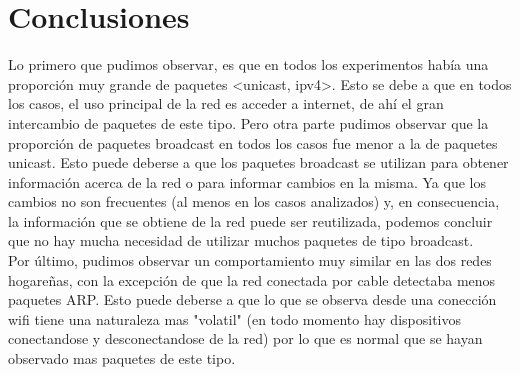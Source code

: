 \section{Conclusiones}
Lo primero que pudimos observar, es que en todos los experimentos había una proporción muy grande de paquetes <unicast, ipv4>. Esto se debe a que en todos los casos, el uso principal de la red es acceder a internet, de ahí el gran intercambio de paquetes de este tipo. Pero otra parte pudimos observar que la proporción de paquetes broadcast en todos los casos fue menor a la de paquetes unicast. Esto puede deberse a que los paquetes broadcast se utilizan para obtener información acerca de la red o para informar cambios en la misma. Ya que los cambios no son frecuentes (al menos en los casos analizados) y, en consecuencia, la información que se obtiene de la red puede ser reutilizada, podemos concluir que no hay mucha necesidad de utilizar muchos paquetes de tipo broadcast.\\
Por último, pudimos observar un comportamiento muy similar en las dos redes hogareñas, con la excepción de que la red conectada por cable detectaba menos paquetes ARP. Esto puede deberse a que lo que se observa desde una conección wifi tiene una naturaleza mas "volatil" (en todo momento hay dispositivos conectandose y desconectandose de la red) por lo que es normal que se hayan observado mas paquetes de este tipo.